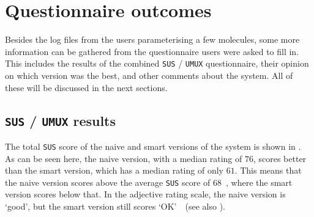 \section{Questionnaire outcomes}
Besides the log files from the users parameterising a few molecules, some more information can be gathered from the questionnaire users were asked to fill in. This includes the results of the combined \verb|SUS| / \verb|UMUX| questionnaire, their opinion on which version was the best, and other comments about the system. All of these will be discussed in the next sections.

\subsection{\texttt{SUS} / \texttt{UMUX} results}
The total \verb|SUS| score of the naive and smart versions of the system is shown in . As can be seen here, the naive version, with a median rating of $76$, scores better than the smart version, which has a median rating of only $61$. This means that the naive version scores above the average \verb|SUS| score of 68~\cite{sauro2011measuring}, where the smart version scores below that. In the adjective rating scale, the naive version is `good', but the smart version still scores `OK'~\cite{bangor2009determining}~(see also ).

